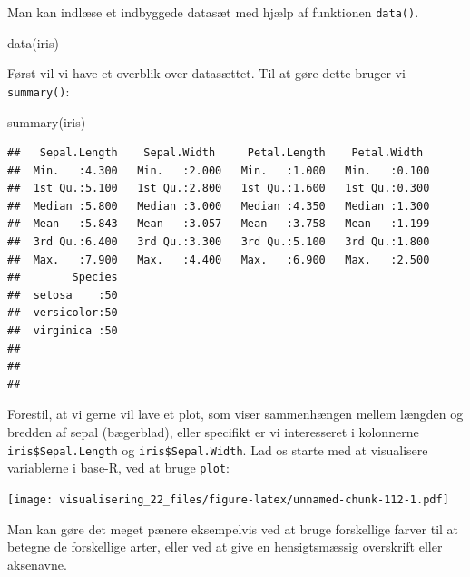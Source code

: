 \documentclass[
]{book}
\newenvironment{Shaded}{\begin{snugshade}}{\end{snugshade}}
\newcommand{\FunctionTok}[1]{\textcolor[rgb]{0.00,0.00,0.00}{#1}}
\newcommand{\NormalTok}[1]{#1}
\newcommand{\SpecialCharTok}[1]{\textcolor[rgb]{0.00,0.00,0.00}{#1}}
\begin{document}
Man kan indlæse et indbyggede datasæt med hjælp af funktionen \texttt{data()}.

\begin{Shaded}
\begin{Highlighting}[]
\FunctionTok{data}\NormalTok{(iris)}
\end{Highlighting}
\end{Shaded}

Først vil vi have et overblik over datasættet. Til at gøre dette bruger vi \texttt{summary()}:

\begin{Shaded}
\begin{Highlighting}[]
\FunctionTok{summary}\NormalTok{(iris)}
\end{Highlighting}
\end{Shaded}

\begin{verbatim}
##   Sepal.Length    Sepal.Width     Petal.Length    Petal.Width   
##  Min.   :4.300   Min.   :2.000   Min.   :1.000   Min.   :0.100  
##  1st Qu.:5.100   1st Qu.:2.800   1st Qu.:1.600   1st Qu.:0.300  
##  Median :5.800   Median :3.000   Median :4.350   Median :1.300  
##  Mean   :5.843   Mean   :3.057   Mean   :3.758   Mean   :1.199  
##  3rd Qu.:6.400   3rd Qu.:3.300   3rd Qu.:5.100   3rd Qu.:1.800  
##  Max.   :7.900   Max.   :4.400   Max.   :6.900   Max.   :2.500  
##        Species  
##  setosa    :50  
##  versicolor:50  
##  virginica :50  
##                 
##                 
## 
\end{verbatim}

Forestil, at vi gerne vil lave et plot, som viser sammenhængen mellem længden og bredden af sepal (bægerblad), eller specifikt er vi interesseret i kolonnerne \texttt{iris\$Sepal.Length} og \texttt{iris\$Sepal.Width}. Lad os starte med at visualisere variablerne i base-R, ved at bruge \texttt{plot}:

\begin{Shaded}
\end{Shaded}

\texttt{[image: visualisering\_22\_files/figure-latex/unnamed-chunk-112-1.pdf]}

Man kan gøre det meget pænere eksempelvis ved at bruge forskellige farver til at betegne de forskellige arter, eller ved at give en hensigtsmæssig overskrift eller aksenavne.
\end{document}
